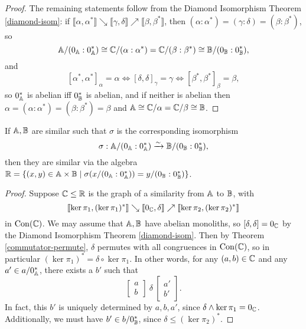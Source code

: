 \begin{appendices}
\begin{proof}
The remaining statements follow from the Diamond Isomorphism Theorem \ref{diamond-isom}: if $\llbracket \alpha, \alpha^* \rrbracket \searrow \llbracket \gamma, \delta \rrbracket \nearrow \llbracket \beta, \beta^* \rrbracket$, then $(\alpha:\alpha^*) = (\gamma:\delta) = (\beta:\beta^*)$, so
\[
\mathbb{A}/(0_{\mathbb{A}}:0_{\mathbb{A}}^*) \cong \mathbb{C}/(\alpha:\alpha^*) = \mathbb{C}/(\beta:\beta^*) \cong \mathbb{B}/(0_{\mathbb{B}}:0_{\mathbb{B}}^*),
\]
and
\[
[\alpha^*,\alpha^*]_\alpha = \alpha \iff [\delta,\delta]_\gamma = \gamma \iff [\beta^*,\beta^*]_\beta = \beta,
\]
so $0_{\mathbb{A}}^*$ is abelian iff $0_{\mathbb{B}}^*$ is abelian, and if neither is abelian then $\alpha = (\alpha:\alpha^*) = (\beta:\beta^*) = \beta$ and $\mathbb{A} \cong \mathbb{C}/\alpha = \mathbb{C}/\beta \cong \mathbb{B}$.
\end{proof}

\begin{prop} If $\mathbb{A}, \mathbb{B}$ are similar such that $\sigma$ is the corresponding isomorphism
\[
\sigma: \mathbb{A}/(0_{\mathbb{A}}:0_{\mathbb{A}}^*) \xrightarrow{\sim} \mathbb{B}/(0_{\mathbb{B}}:0_{\mathbb{B}}^*),
\]
then they are similar via the algebra $\mathbb{R} = \{(x,y) \in \mathbb{A} \times \mathbb{B} \mid \sigma(x/(0_{\mathbb{A}}:0_{\mathbb{A}}^*)) = y/(0_{\mathbb{B}}:0_{\mathbb{B}}^*)\}$.
\end{prop}
\begin{proof} Suppose $\mathbb{C} \le \mathbb{R}$ is the graph of a similarity from $\mathbb{A}$ to $\mathbb{B}$, with
\[
\llbracket \ker \pi_1, (\ker \pi_1)^* \rrbracket \searrow \llbracket 0_{\mathbb{C}}, \delta \rrbracket \nearrow \llbracket \ker \pi_2, (\ker \pi_2)^* \rrbracket
\]
in $\operatorname{Con}(\mathbb{C})$. We may assume that $\mathbb{A}, \mathbb{B}$ have abelian monoliths, so $[\delta,\delta] = 0_{\mathbb{C}}$ by the Diamond Isomorphism Theorem \ref{diamond-isom}. Then by Theorem \ref{commutator-permute}, $\delta$ permutes with all congruences in $\operatorname{Con}(\mathbb{C})$, so in particular $(\ker \pi_1)^* = \delta \circ \ker \pi_1$. In other words, for any $(a,b) \in \mathbb{C}$ and any $a' \in a/0_{\mathbb{A}}^*$, there exists a $b'$ such that
\[
\begin{bmatrix} a\\ b\end{bmatrix}\ \delta\ \begin{bmatrix} a'\\ b'\end{bmatrix}.
\]
In fact, this $b'$ is uniquely determined by $a,b,a'$, since $\delta \wedge \ker \pi_1 = 0_{\mathbb{C}}$. Additionally, we must have $b' \in b/0_{\mathbb{B}}^*$, since $\delta \le (\ker \pi_2)^*$.


\end{proof}
\end{appendices}

